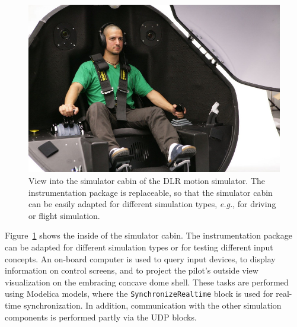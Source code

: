 \documentclass{resources/modelica}
\newcommand{\modelica}[1]{\lstinline[language=modelica]|#1|}
\begin{document}
\begin{figure}[htb]
  \centering \includegraphics[width=0.9\columnwidth]{figures/DLRSimulatorCabin}
  \caption{View into the simulator cabin of the DLR motion simulator. The
  instrumentation package is replaceable, so that the simulator cabin can be
  easily adapted for different simulation types, \textit{e.g.}, for driving or
  flight simulation.}
  \label{fig:DLRSimulatorCabin}
\end{figure}

Figure~\ref{fig:DLRSimulatorCabin} shows the inside of the simulator cabin.
The instrumentation package can be adapted
for different simulation types or for testing different input concepts.
An on-board computer is used to query input devices, to display information on
control screens, and to project the pilot's outside view visualization on the
embracing concave dome shell. These
tasks are performed using Modelica models, where the
\modelica{SynchronizeRealtime} block is used for real-time
synchronization. In addition, communication with the other simulation components is
performed partly via the UDP blocks.
\end{document}
